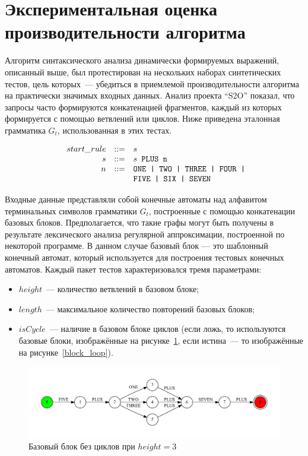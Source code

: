 \section{Экспериментальная оценка производительности алгоритма}\label{SyntTestsEvalDescr}

Алгоритм синтаксического анализа динамически формируемых выражений, описанный выше, был протестирован на нескольких наборах синтетических тестов, цель которых~--- убедиться в приемлемой производительности алгоритма на практически значимых входных данных. Анализ  проекта ``S2O'' показал, что запросы часто формируются конкатенацией фрагментов, каждый из которых формируется с помощью ветвлений или циклов. Ниже приведена эталонная грамматика $G_t$, использованная в этих тестах.

$$
\begin{array}{crcl}
& start\_rule &::=& s \\
& s & ::= & s \mbox{\texttt{ PLUS }} \mbox{\texttt{n}}\\
& n & ::= & \mbox{\texttt{ONE | }} \mbox{\texttt{TWO | }} \mbox{\texttt{THREE | }} \mbox{\texttt{FOUR | }} \\
&   &     & \mbox{\texttt{FIVE | }} \mbox{\texttt{SIX | }} \mbox{\texttt{SEVEN}}
\end{array}
$$

Входные данные представляли собой конечные автоматы над алфавитом терминальных символов грамматики $G_t$, построенные с помощью конкатенации базовых блоков. Предполагается, что такие графы могут быть получены в результате лексического анализа регулярной аппроксимации, построенной по некоторой программе. В данном случае базовый блок --- это шаблонный конечный автомат, который используется для построения тестовых конечных автоматов. Каждый пакет тестов характеризовался тремя параметрами: 

\begin{itemize}
  \item $height$~--- количество ветвлений в базовом блоке;
  \item $length$~--- максимальное количество повторений базовых блоков;
  \item $isCycle$~--- наличие в базовом блоке циклов (если ложь, то используются базовые блоки, изображённые на рисунке~\ref{block}, если истина~--- то изображённые на рисунке~\ref{block_loop}).
\end{itemize}

\begin{figure}[h!]
 \centering
 \includegraphics[width=15cm]{pics/block.pdf}
 \caption{Базовый блок без циклов при $height=3$}
 \label{block}
\end{figure}

